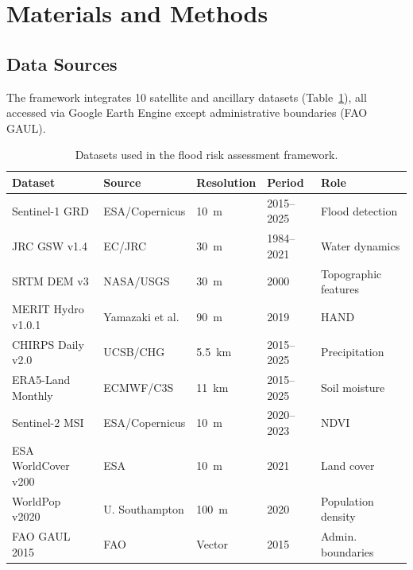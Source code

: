 \documentclass{article}
\begin{document}
\section{Materials and Methods}
\label{sec:methods}

\subsection{Data Sources}

The framework integrates 10 satellite and ancillary datasets (Table~\ref{tab:data_sources}), all accessed via Google Earth Engine \citep{Gorelick2017} except administrative boundaries (FAO GAUL).

\begin{table}[htbp]
\caption{Datasets used in the flood risk assessment framework.}
\label{tab:data_sources}
\centering
\footnotesize
\begin{tabular}{lllll}
\toprule
\textbf{Dataset} & \textbf{Source} & \textbf{Resolution} & \textbf{Period} & \textbf{Role} \\
\midrule
Sentinel-1 GRD & ESA/Copernicus & \SI{10}{\metre} & 2015--2025 & Flood detection \\
JRC GSW v1.4 & EC/JRC & \SI{30}{\metre} & 1984--2021 & Water dynamics \\
SRTM DEM v3 & NASA/USGS & \SI{30}{\metre} & 2000 & Topographic features \\
MERIT Hydro v1.0.1 & Yamazaki et al. & \SI{90}{\metre} & 2019 & HAND \\
CHIRPS Daily v2.0 & UCSB/CHG & \SI{5.5}{\kilo\metre} & 2015--2025 & Precipitation \\
ERA5-Land Monthly & ECMWF/C3S & \SI{11}{\kilo\metre} & 2015--2025 & Soil moisture \\
Sentinel-2 MSI & ESA/Copernicus & \SI{10}{\metre} & 2020--2023 & NDVI \\
ESA WorldCover v200 & ESA & \SI{10}{\metre} & 2021 & Land cover \\
WorldPop v2020 & U. Southampton & \SI{100}{\metre} & 2020 & Population density \\
FAO GAUL 2015 & FAO & Vector & 2015 & Admin. boundaries \\
\bottomrule
\end{tabular}
\end{table}
\end{document}
